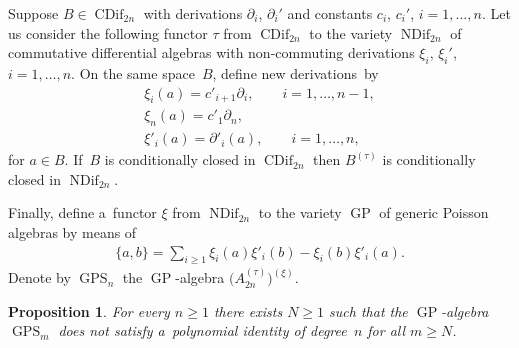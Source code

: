 \documentclass[11pt]{article}
\newtheorem{proposition}{Proposition}
\begin{document}
Suppose $B\in \operatorname{CDif}_{2n}$ with derivations $\partial_i$, $\partial_i'$ and constants $c_i$, $c_i'$, $i=1,\dots, n$.
Let us consider the following functor $\tau $ from $\operatorname{CDif}_{2n}$ to the variety $\operatorname{NDif}_{2n}$ of commutative dif\/ferential
algebras with non-commuting derivations $\xi_i$, $\xi_i'$, $i=1,\dots, n$.
On the same space~$B$, def\/ine new derivations~by
\begin{gather*}
\xi_i(a) = c'_{i+1}\partial_i,
\qquad
i=1,\dots, n-1,
\\
\xi_n(a) = c'_1\partial_n,
\\
\xi'_i(a) = \partial'_i(a),
\qquad
i=1,\dots, n,
\end{gather*}
for $a\in B$.
If~$B$ is conditionally closed in $\operatorname{CDif}_{2n}$ then $B^{(\tau)}$ is conditionally closed in $\operatorname{NDif}_{2n}$.

Finally, def\/ine a~functor $\xi $ from $\operatorname{NDif}_{2n}$ to the variety $\operatorname{GP}$ of generic Poisson algebras by means of
\begin{gather*}
\{a,b\} = \sum\limits_{i\ge 1} \xi_i(a)\xi'_i(b) - \xi_i(b)\xi'_i(a).
\end{gather*}
Denote by $\operatorname{GPS}_n$ the $\operatorname{GP}$-algebra $\big(A_{2n}^{(\tau)} \big)^{(\xi)}$.

\begin{proposition}
\label{prop:NonPIGPS}
For every $n\ge 1$ there exists $N\ge 1$ such that the $\operatorname{GP}$-algebra $\operatorname{GPS}_{m}$ does not satisfy a~polynomial identity of
degree~$n$ for all $m\ge N$.
\end{proposition}
\end{document}
